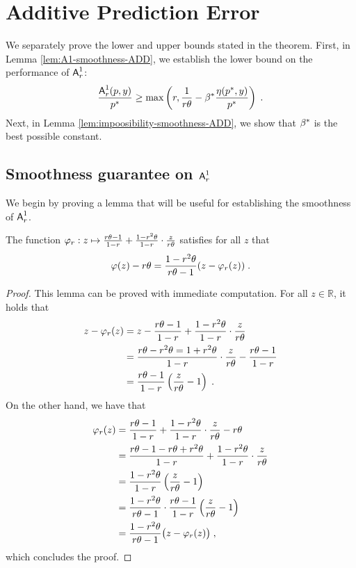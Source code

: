 \section{Additive Prediction Error}\label{appendix:additive-error}
\LowerBoundSmoothnessAdditive*

We separately prove the lower and upper bounds stated in the theorem. First, in Lemma \ref{lem:A1-smoothness-ADD}, we establish the lower bound on the performance of $\mbox{\textup{\textsf{A}}}^1_r$:  
\[
\frac{\mbox{\textup{\textsf{A}}}^1_r(p, y)}{p^*} \geq \max \left( r, \frac{1}{r \theta} - \beta^* \frac{\eta(p^*, y)}{p^*} \right)\;.
\]
Next, in Lemma \ref{lem:impoosibility-smoothness-ADD}, we show that $\beta^*$ is the best possible constant.

\subsection{Smoothness guarantee on \texorpdfstring{$\mbox{\textup{\textsf{A}}}^1_r$}{A}}
We begin by proving a lemma that will be useful for establishing the smoothness of $\mbox{\textup{\textsf{A}}}^1_r$.

\begin{lemma}
The function $\varphi_r : z \mapsto \frac{r \theta - 1}{1-r} + \frac{1-r^2\theta}{1-r} \cdot \frac{z}{r \theta}$ satisfies for all $z$ that
\[
\varphi(z) - r \theta = \frac{1-r^2\theta}{r\theta - 1} (z - \varphi_r(z))\;.
\]
\end{lemma}

\begin{proof}\label{lem:(varphi-rub)/(y-varphi)}
This lemma can be proved with immediate computation. For all $z \in \mathbb{R}$, it holds that
\begin{align*}
z - \varphi_r(z)
&= z - \frac{r \theta - 1}{1-r} + \frac{1-r^2\theta}{1-r} \cdot \frac{z}{r \theta}\\
&= \frac{r \theta - r^2\theta = 1 + r^2\theta}{1-r} \cdot \frac{z}{r \theta} - \frac{r \theta - 1}{1-r}\\
&= \frac{r \theta - 1}{1-r} \left( \frac{z}{r \theta} - 1 \right)\;.
\end{align*}
On the other hand, we have that
\begin{align*}
\varphi_r(z) 
&= \frac{r \theta - 1}{1-r} + \frac{1-r^2\theta}{1-r} \cdot \frac{z}{r \theta} - r \theta\\
&= \frac{r\theta-1 - r\theta + r^2 \theta}{1-r} + \frac{1-r^2\theta}{1-r} \cdot \frac{z}{r \theta}\\
&= \frac{1-r^2\theta}{1-r} \left( \frac{z}{r \theta} - 1\right)\\
&= \frac{1-r^2\theta}{r\theta - 1} \cdot \frac{r\theta - 1}{1-r} \left( \frac{z}{r \theta} - 1\right)\\
&= \frac{1-r^2\theta}{r\theta - 1} \big( z - \varphi_r(z) \big)\;,
\end{align*}
which concludes the proof.
\end{proof}


